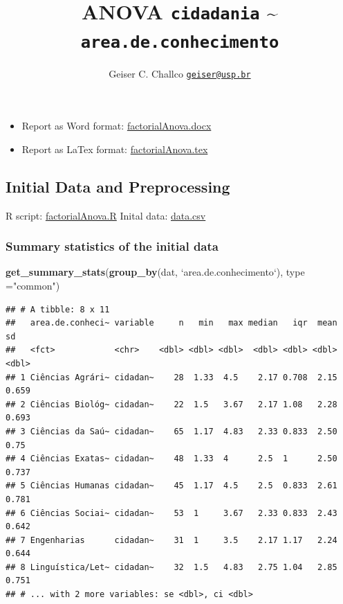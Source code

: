 \documentclass[]{article}
\title{ANOVA \texttt{cidadania} \textasciitilde{} \texttt{area.de.conhecimento}}
\author{Geiser C. Challco \href{mailto:geiser@usp.br}{\nolinkurl{geiser@usp.br}}}
\date{}
\newenvironment{Shaded}{\begin{snugshade}}{\end{snugshade}}
\newcommand{\DataTypeTok}[1]{\textcolor[rgb]{0.13,0.29,0.53}{#1}}
\newcommand{\KeywordTok}[1]{\textcolor[rgb]{0.13,0.29,0.53}{\textbf{#1}}}
\newcommand{\NormalTok}[1]{#1}
\newcommand{\StringTok}[1]{\textcolor[rgb]{0.31,0.60,0.02}{#1}}
\providecommand{\tightlist}{%
  \setlength{\itemsep}{0pt}\setlength{\parskip}{0pt}}
\begin{document}
\maketitle

\begin{itemize}
\tightlist
\item
  Report as Word format: \url{factorialAnova.docx}
\item
  Report as LaTex format: \url{factorialAnova.tex}
\end{itemize}

\hypertarget{initial-data-and-preprocessing}{%
\subsection{Initial Data and
Preprocessing}\label{initial-data-and-preprocessing}}

R script: \url{factorialAnova.R} Inital data: \url{data.csv}

\hypertarget{summary-statistics-of-the-initial-data}{%
\subsubsection{Summary statistics of the initial
data}\label{summary-statistics-of-the-initial-data}}

\begin{Shaded}
\begin{Highlighting}[]
\KeywordTok{get_summary_stats}\NormalTok{(}\KeywordTok{group_by}\NormalTok{(dat, }\StringTok{`}\DataTypeTok{area.de.conhecimento}\StringTok{`}\NormalTok{), }\DataTypeTok{type =}\StringTok{"common"}\NormalTok{)}
\end{Highlighting}
\end{Shaded}

\begin{verbatim}
## # A tibble: 8 x 11
##   area.de.conheci~ variable     n   min   max median   iqr  mean    sd
##   <fct>            <chr>    <dbl> <dbl> <dbl>  <dbl> <dbl> <dbl> <dbl>
## 1 Ciências Agrári~ cidadan~    28  1.33  4.5    2.17 0.708  2.15 0.659
## 2 Ciências Biológ~ cidadan~    22  1.5   3.67   2.17 1.08   2.28 0.693
## 3 Ciências da Saú~ cidadan~    65  1.17  4.83   2.33 0.833  2.50 0.75 
## 4 Ciências Exatas~ cidadan~    48  1.33  4      2.5  1      2.50 0.737
## 5 Ciências Humanas cidadan~    45  1.17  4.5    2.5  0.833  2.61 0.781
## 6 Ciências Sociai~ cidadan~    53  1     3.67   2.33 0.833  2.43 0.642
## 7 Engenharias      cidadan~    31  1     3.5    2.17 1.17   2.24 0.644
## 8 Linguística/Let~ cidadan~    32  1.5   4.83   2.75 1.04   2.85 0.751
## # ... with 2 more variables: se <dbl>, ci <dbl>
\end{verbatim}
\end{document}
